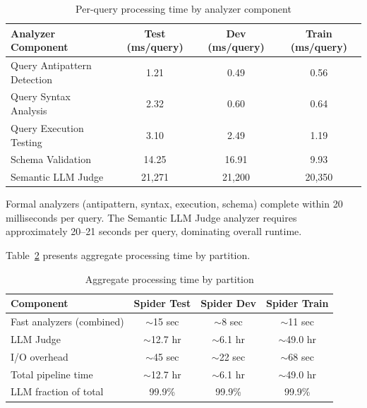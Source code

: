 \documentclass[]{einformatica}
\begin{document}
\begin{table}[ht]
    \caption{Per-query processing time by analyzer component}
    \label{tab:performance}
    \centering
    \footnotesize
    \begin{tabular}{lccc}
        \toprule
        \textbf{Analyzer Component} & \textbf{Test (ms/query)} & \textbf{Dev (ms/query)} & \textbf{Train (ms/query)} \\
        \midrule
        Query Antipattern Detection & 1.21 & 0.49 & 0.56 \\
        Query Syntax Analysis & 2.32 & 0.60 & 0.64 \\
        Query Execution Testing & 3.10 & 2.49 & 1.19 \\
        Schema Validation & 14.25 & 16.91 & 9.93 \\
        Semantic LLM Judge & 21,271 & 21,200 & 20,350 \\
        \bottomrule
    \end{tabular}
\end{table}

Formal analyzers (antipattern, syntax, execution, schema) complete within 20 milliseconds per query. The Semantic LLM Judge analyzer requires approximately 20--21 seconds per query, dominating overall runtime.

Table~\ref{tab:aggregate_performance} presents aggregate processing time by partition.

\begin{table}[ht]
    \caption{Aggregate processing time by partition}
    \label{tab:aggregate_performance}
    \centering
    \footnotesize
    \begin{tabular}{lccc}
        \toprule
        \textbf{Component} & \textbf{Spider Test} & \textbf{Spider Dev} & \textbf{Spider Train} \\
        \midrule
        Fast analyzers (combined) & $\sim$15 sec & $\sim$8 sec & $\sim$11 sec \\
        LLM Judge & $\sim$12.7 hr & $\sim$6.1 hr & $\sim$49.0 hr \\
        I/O overhead & $\sim$45 sec & $\sim$22 sec & $\sim$68 sec \\
        Total pipeline time & $\sim$12.7 hr & $\sim$6.1 hr & $\sim$49.0 hr \\
        LLM fraction of total & 99.9\% & 99.9\% & 99.9\% \\
        \bottomrule
    \end{tabular}
\end{table}
\end{document}
